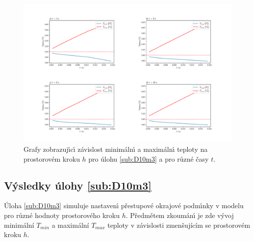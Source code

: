             \begin{figure}[h]
                \centering
                \includegraphics[width=\linewidth, trim=4cm 1cm 4cm 4cm]{Img/Kapitola4/d_10m3.pdf}
                \caption{Grafy zobrazuj\'{\i}c\'{\i} z\'{a}vislost minim\'{a}ln\'{\i} a maxim\'{a}ln\'{\i} teploty na prostorov\'{e}m kroku $h$ pro \'{u}lohu \ref{sub:D10m3} a pro r\r{u}zn\'{e} \v{c}asy $t$.}
                \label{fig:Prob10m3}
            \end{figure}


        \subsection{V\'{y}sledky \'{u}lohy \ref{sub:D10m3}}
    
            \'{U}loha \ref{sub:D10m3} simuluje nastaven\'{\i} p\v{r}estupov\'{e} okrajov\'{e} podm\'{\i}nky v modelu pro r\r{u}zn\'{e} hodnoty prostorov\'{e}ho kroku $h$. P\v{r}edm\v{e}tem zkoum\'{a}n\'{\i} je zde v\'{y}voj minim\'{a}ln\'{i} $T_{min}$ a maxim\'{a}ln\'{i} $T_{max}$ teploty v z\'{a}vislosti zmen\v{s}uj\'{i}c\'{i}m se prostorov\'{e}m kroku $h$. 
            

        
